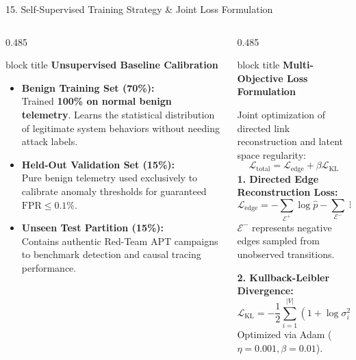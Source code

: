 \documentclass[aspectratio=169,10pt]{beamer}
\begin{document}
\begin{frame}[t]{15. Self-Supervised Training Strategy \& Joint Loss Formulation}
\vspace{-0.2em}
\begin{columns}[T]
\begin{column}{0.485\textwidth}
\begin{beamercolorbox}[rounded=true,shadow=false,sep=0.30em,wd=\linewidth]{block title}
\textbf{\scriptsize Unsupervised Baseline Calibration}
\end{beamercolorbox}
\vspace{0.10em}
{\fontsize{6.8pt}{9.4pt}\selectfont
\begin{itemize}\itemsep0.20em
  \item \textbf{Benign Training Set (70\%):}\\
  Trained \textbf{100\% on normal benign telemetry}. Learns the statistical distribution of legitimate system behaviors without needing attack labels.
  \item \textbf{Held-Out Validation Set (15\%):}\\
  Pure benign telemetry used exclusively to calibrate anomaly thresholds for guaranteed $\text{FPR} \le 0.1\%$.
  \item \textbf{Unseen Test Partition (15\%):}\\
  Contains authentic Red-Team APT campaigns to benchmark detection and causal tracing performance.
\end{itemize}
}
\end{column}

\begin{column}{0.485\textwidth}
\begin{beamercolorbox}[rounded=true,shadow=false,sep=0.30em,wd=\linewidth]{block title}
\textbf{\scriptsize Multi-Objective Loss Formulation}
\end{beamercolorbox}
\vspace{0.10em}
{\fontsize{6.8pt}{9.4pt}\selectfont
Joint optimization of directed link reconstruction and latent space regularity:
\[
\mathcal{L}_{\text{total}} = \mathcal{L}_{\text{edge}} + \beta \mathcal{L}_{\text{KL}}
\]
\textbf{1. Directed Edge Reconstruction Loss:}
\[
\mathcal{L}_{\text{edge}} = -\sum_{\mathcal{E}^+} \log \hat{p} - \sum_{\mathcal{E}^-} \log (1 - \hat{p})
\]
$\mathcal{E}^-$ represents negative edges sampled from unobserved transitions.

\textbf{2. Kullback-Leibler Divergence:}
\[
\mathcal{L}_{\text{KL}} = -\frac{1}{2} \sum_{i=1}^{|V|} \left(1 + \log \sigma_i^2 - \mu_i^2 - \sigma_i^2\right)
\]
Optimized via Adam ($\eta = 0.001, \beta = 0.01$).
}
\end{column}
\end{columns}
\end{frame}
\end{document}
